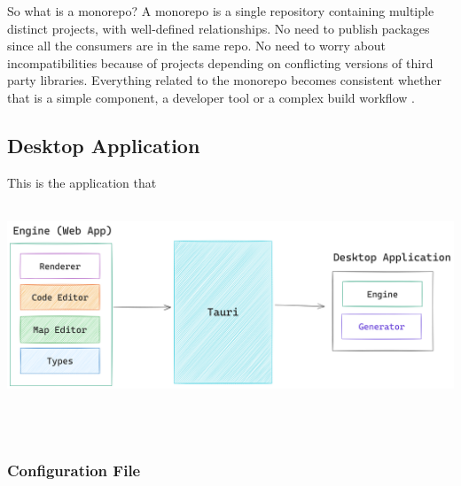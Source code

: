\documentclass{article}
\begin{document}
So what is a monorepo? A monorepo is a single repository containing multiple distinct projects, with well-defined relationships. No need to publish packages since all the consumers are in the same repo. No need to worry about incompatibilities because of projects depending on conflicting versions of third party libraries. Everything related to the monorepo becomes consistent whether that is a simple component, a developer tool or a complex build workflow \cite{monorepo}.

\subsection{Desktop Application}
This is the application that \\\\
\begin{minipage}{\linewidth}
    \centering
    \includegraphics[width=1\textwidth]{pipeline.png}
\end{minipage}\\\\
\subsubsection{Configuration File}
\end{document}
